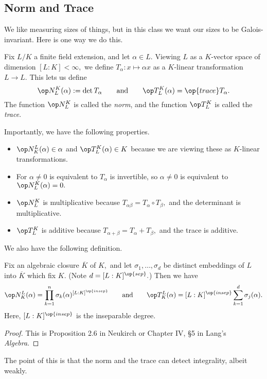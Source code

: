 \subsection{Norm and Trace}
We like measuring sizes of things, but in this class we want our sizes to be Galois-invariant. Here is one way we do this.
\begin{defi}
    Fix $L/K$ a finite field extension, and let $\alpha\in L.$ Viewing $L$ as a $K$-vector space of dimension $[L:K]<\infty,$ we define $T_\alpha:x\mapsto\alpha x$ as a $K$-linear transformation $L\to L.$ This lets us define
    \[\op N^K_L(\alpha):=\det T_\alpha\qquad\text{and}\qquad\op T^K_L(\alpha)=\op{trace}T_\alpha.\]
    The function $\op N^K_L$ is called the \textit{norm}, and the function $\op T^K_L$ is called the \textit{trace}.
\end{defi}
\begin{remark}
    Importantly, we have the following properties.
    \begin{itemize}
        \item $\op N_K^L(\alpha)\in \alpha$ and $\op T^K_L(\alpha)\in K$ because we are viewing these as $K$-linear transformations.
        \item For $\alpha\ne0$ is equivalent to $T_\alpha$ is invertible, so $\alpha\ne0$ is equivalent to $\op N^K_L(\alpha)=0.$
        \item $\op N_L^K$ is multiplicative because $T_{\alpha\beta}=T_\alpha\circ T_\beta,$ and the determinant is multiplicative.
        \item $\op T_L^K$ is additive because $T_{\alpha+\beta}=T_\alpha+T_\beta,$ and the trace is additive.
    \end{itemize}
\end{remark}
We also have the following definition.
\begin{prop}
    Fix an algebraic closure $\overline K$ of $K,$ and let $\sigma_1,\ldots,\sigma_d$ be distinct embeddings of $L$ into $\overline K$ which fix $K.$ (Note $d=[L:K]^{\op{sep}}.$) Then we have
    \[\op N_K^L(\alpha)=\prod_{k=1}^n\sigma_k(\alpha)^{[L:K]^{\op{insep}}}\qquad\text{and}\qquad\op T_K^L(\alpha)=[L:K]^{\op{insep}}\sum_{k=1}^d\sigma_j(\alpha).\]
    Here, $[L:K]^{\op{insep}}$ is the inseparable degree.
\end{prop}
\begin{proof}
    This is Proposition 2.6 in Neukirch or Chapter IV, \S5 in Lang's \textit{Algebra}.
\end{proof}
The point of this is that the norm and the trace can detect integrality, albeit weakly.
